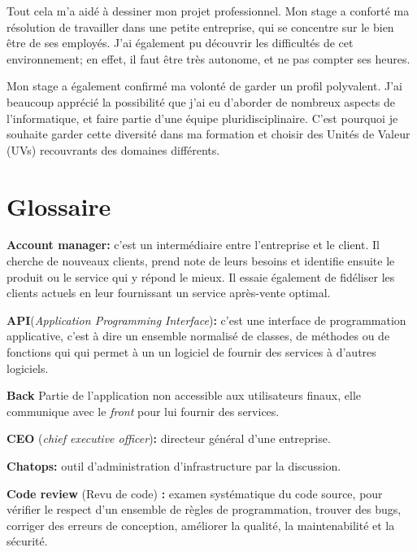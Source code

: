 \bigskip

Tout cela m'a aidé à dessiner mon projet professionnel. Mon stage a
conforté ma résolution de travailler dans une petite entreprise, qui se
concentre sur le bien être de ses employés. J'ai également pu découvrir
les difficultés de cet environnement; en effet, il faut être très
autonome, et ne pas compter ses heures.

\bigskip

Mon stage a également confirmé ma volonté de garder un profil
polyvalent. J'ai beaucoup apprécié la possibilité que j'ai eu d'aborder
de nombreux aspects de l'informatique, et faire partie d'une équipe
pluridisciplinaire. C'est pourquoi je souhaite garder cette diversité
dans ma formation et choisir des Unités de Valeur (UVs) recouvrants des
domaines différents.

\newpage

\section{Glossaire}\label{glossaire}

\textbf{Account manager:} c'est un intermédiaire entre l'entreprise et
le client. Il cherche de nouveaux clients, prend note de leurs besoins
et identifie ensuite le produit ou le service qui y répond le mieux. Il
essaie également de fidéliser les clients actuels en leur fournissant un
service après-vente optimal.

\bigskip

\textbf{API}(\emph{Application Programming Interface})\textbf{:} c'est
une interface de programmation applicative, c'est à dire un ensemble
normalisé de classes, de méthodes ou de fonctions qui qui permet à un un
logiciel de fournir des services à d'autres logiciels.

\bigskip

\textbf{Back} Partie de l'application non accessible aux utilisateurs
finaux, elle communique avec le \emph{front} pour lui fournir des
services.

\bigskip

\textbf{CEO} (\emph{chief executive officer})\textbf{:} directeur
général d'une entreprise.

\bigskip

\textbf{Chatops:} outil d'administration d'infrastructure par la
discussion.

\bigskip

\textbf{Code review} (Revu de code) \textbf{:} examen systématique du
code source, pour vérifier le respect d'un ensemble de règles de
programmation, trouver des bugs, corriger des erreurs de conception,
améliorer la qualité, la maintenabilité et la sécurité.

